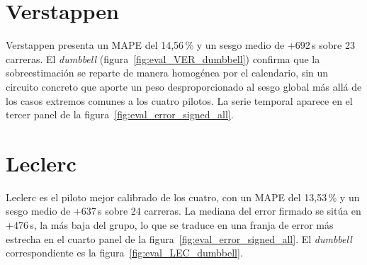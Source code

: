 \section*{Verstappen}
\label{ann:eval_VER}

Verstappen presenta un MAPE del 14{,}56\,\% y un sesgo medio de +692\,s sobre 23 carreras. El \textit{dumbbell} (figura~\ref{fig:eval_VER_dumbbell}) confirma que la sobreestimación se reparte de manera homogénea por el calendario, sin un circuito concreto que aporte un peso desproporcionado al sesgo global más allá de los casos extremos comunes a los cuatro pilotos. La serie temporal aparece en el tercer panel de la figura~\ref{fig:eval_error_signed_all}.

\section*{Leclerc}
\label{ann:eval_LEC}

Leclerc es el piloto mejor calibrado de los cuatro, con un MAPE del 13{,}53\,\% y un sesgo medio de +637\,s sobre 24 carreras. La mediana del error firmado se sitúa en +476\,s, la más baja del grupo, lo que se traduce en una franja de error más estrecha en el cuarto panel de la figura~\ref{fig:eval_error_signed_all}. El \textit{dumbbell} correspondiente es la figura~\ref{fig:eval_LEC_dumbbell}.

